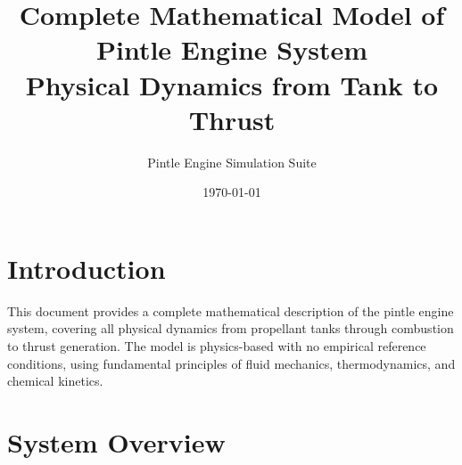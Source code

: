 \documentclass[12pt,a4paper]{article}
\title{Complete Mathematical Model of Pintle Engine System\\Physical Dynamics from Tank to Thrust}
\author{Pintle Engine Simulation Suite}
\date{\today}
\begin{document}
\maketitle

\tableofcontents
\newpage

\section{Introduction}

This document provides a complete mathematical description of the pintle engine system, covering all physical dynamics from propellant tanks through combustion to thrust generation. The model is physics-based with no empirical reference conditions, using fundamental principles of fluid mechanics, thermodynamics, and chemical kinetics.

\section{System Overview}
\end{document}
